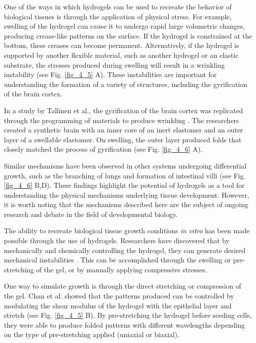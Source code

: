 One of the ways in which hydrogels can be used to recreate the behavior of biological tissues is through the application of physical stress. For example, swelling of the hydrogel can cause it to undergo rapid large volumetric changes, producing crease-like patterns on the surface. If the hydrogel is constrained at the bottom, these creases can become permanent. Alternatively, if the hydrogel is supported by another flexible material, such as another hydrogel or an elastic substrate, the stresses produced during swelling will result in a wrinkling instability (see Fig. \ref{fig_4_5} A). These instabilities are important for understanding the formation of a variety of structures, including the gyrification of the brain cortex.

In a study by Tallinen et al., the gyrification of the brain cortex was replicated through the programming of materials to produce wrinkling \cite{tallinen2016}. The researchers created a synthetic brain with an inner core of an inert elastomer and an outer layer of a swellable elastomer. On swelling, the outer layer produced folds that closely matched the process of gyrification (see Fig. \ref{fig_4_6} A).

Similar mechanisms have been observed in other systems undergoing differential growth, such as the branching of lungs and formation of intestinal villi \cite{varner2015,shyer2013} (see Fig. \ref{fig_4_6} B,D). These findings highlight the potential of hydrogels as a tool for understanding the physical mechanisms underlying tissue development. However, it is worth noting that the mechanisms described here are the subject of ongoing research and debate in the field of developmental biology.

The ability to recreate biological tissue growth conditions \textit{in vitro} has been made possible through the use of hydrogels. Researchers have discovered that by mechanically and chemically controlling the hydrogel, they can generate desired mechanical instabilities \cite{dervaux2012}. This can be accomplished through the swelling or pre-stretching of the gel, or by manually applying compressive stresses.

One way to simulate growth is through the direct stretching or compression of the gel. Chan et al. showed that the patterns produced can be controlled by modulating the shear modulus of the hydrogel with the epithelial layer and stretch \cite{chan2018} (see Fig. \ref{fig_4_5} B). By pre-stretching the hydrogel before seeding cells, they were able to produce folded patterns with different wavelengths depending on the type of pre-stretching applied (uniaxial or biaxial). 

